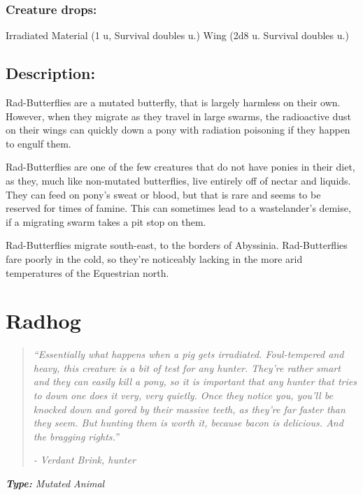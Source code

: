 \documentclass[11pt,a4paper,twocolumn]{book}
\begin{document}
	\subsubsection*{Creature drops:}
	Irradiated Material (1 u, Survival doubles u.)
	Wing (2d8 u. Survival doubles u.)
	
	
	
	
	\subsection*{Description:}
	Rad-Butterflies are a mutated butterfly, that is largely harmless on their own. However, when they migrate as they travel in large swarms, the radioactive dust on their wings can quickly down a pony with radiation poisoning if they happen to engulf them.
	
	Rad-Butterflies are one of the few creatures that do not have ponies in their diet, as they, much like non-mutated butterflies, live entirely off of nectar and liquids. They can feed on pony's sweat or blood, but that is rare and seems to be reserved for times of famine. This can sometimes lead to a wastelander's demise, if a migrating swarm takes a pit stop on them.
	
	Rad-Butterflies migrate south-east, to the borders of Abyssinia. Rad-Butterflies fare poorly in the cold, so they're noticeably lacking in the more arid temperatures of the Equestrian north.
	
	\clearpage
	
	\section*{Radhog}
	\begin{quote}
		\emph{``Essentially what happens when a pig gets irradiated. Foul-tempered and heavy, this creature is a bit of test for any hunter. They're rather smart and they can easily kill a pony, so it is important that any hunter that tries to down one does it very, very quietly. Once they notice you, you'll be knocked down and gored by their massive teeth, as they're far faster than they seem. But hunting them is worth it, because bacon is delicious. And the bragging rights.''}
		
		\emph{-	Verdant Brink, hunter}
	\end{quote}
	
	\emph{\textbf{Type:} Mutated Animal}
	
\end{document}
